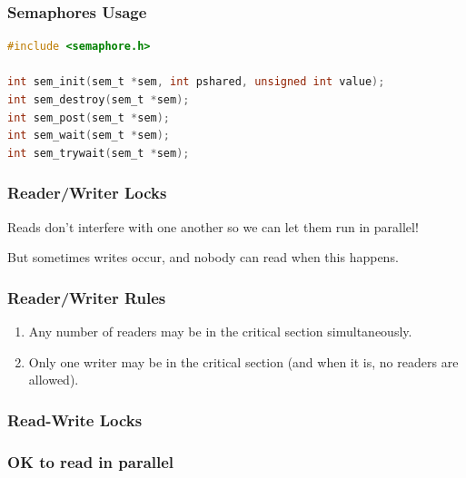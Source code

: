 \begin{frame}[fragile]
  \frametitle{Semaphores Usage}
  

  \begin{lstlisting}[language=C]
#include <semaphore.h>

int sem_init(sem_t *sem, int pshared, unsigned int value);
int sem_destroy(sem_t *sem);
int sem_post(sem_t *sem);
int sem_wait(sem_t *sem);
int sem_trywait(sem_t *sem);
  \end{lstlisting}

\end{frame}


\begin{frame}
\frametitle{Reader/Writer Locks}
Reads don't interfere with one another so we can let them run in parallel!

But sometimes writes occur, and nobody can read when this happens.

\end{frame}

\begin{frame}
\frametitle{Reader/Writer Rules}


\begin{enumerate}
\item Any number of readers may be in the critical section simultaneously.
\item Only one writer may be in the critical section (and when it is, no readers are allowed).
\end{enumerate}


\end{frame}



\begin{frame}
  \frametitle{Read-Write Locks}

  \begin{center}
    
  \end{center}
\end{frame}

\begin{frame}
  \frametitle{OK to read in parallel}

  \begin{center}
    
  \end{center}
\end{frame}

